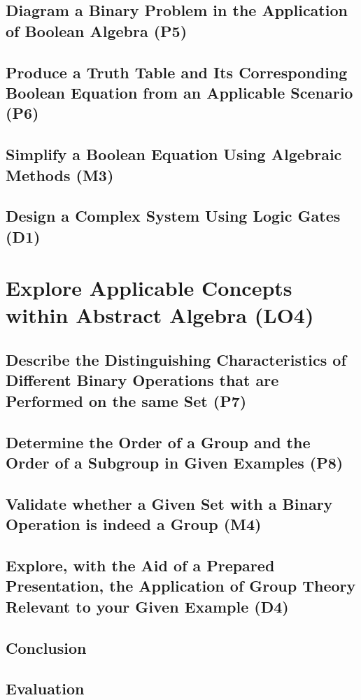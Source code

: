 \documentclass[12pt, a4paper, twoside]{report} %
\begin{document}
\section{Diagram a Binary Problem in the Application of Boolean Algebra (P5)}
\label{sec:P5}

\section{Produce a Truth Table and Its Corresponding Boolean Equation from an Applicable Scenario (P6)}
\label{sec:P6}

\section{Simplify a Boolean Equation Using Algebraic Methods (M3)}
\label{sec:M3}

\section{Design a Complex System Using Logic Gates (D1)}
\label{sec:D1}

\chapter{Explore Applicable Concepts within Abstract Algebra (LO4)}
\label{chap:LO4}

\section{Describe the Distinguishing Characteristics of Different Binary Operations that are Performed on the same Set (P7)}
\label{sec:P7}

\section{Determine the Order of a Group and the Order of a Subgroup in Given Examples (P8)}
\label{sec:P8}

\section{Validate whether a Given Set with a Binary Operation is indeed a Group (M4)}
\label{sec:M4}

\section{Explore, with the Aid of a Prepared Presentation, the Application of Group Theory Relevant to your Given Example (D4)}
\label{sec:D4}


\cite{doe2021}
\newpage
\section*{Conclusion}
\newpage
\section*{Evaluation}


\end{document}
